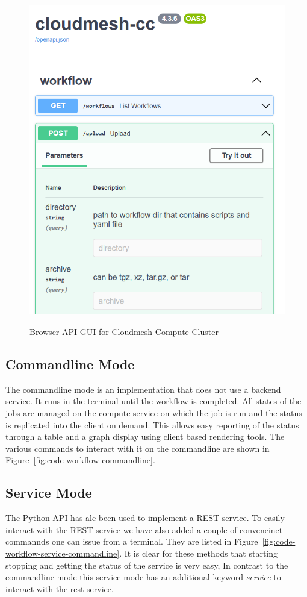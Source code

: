 \begin{figure}[htb]
{\centering
\includegraphics[width=0.52\columnwidth]{images/upload_api.png}
}
\caption{Browser API GUI for Cloudmesh Compute Cluster}

\label{fig:openapi}

\end{figure}


\subsection{Commandline Mode}

The commandline mode is an implementation that does not use a backend
service. It runs in the terminal until the workflow is completed. All
states of the jobs are managed on the compute service on which the job
is run and the status is replicated into the client on demand. This
allows easy reporting of the status through a table and a graph
display using client based rendering tools. The various commands to
interact with it on the commandline are shown in
Figure~\ref{fig:code-workflow-commandline}.


\subsection{Service Mode}

The Python API has ale been used to implement a REST service. To
easily interact with the REST service we have also added a couple of
conveneinet commannds one can issue from a terminal. They are listed
in Figure~\ref{fig:code-workflow-service-commandline}. It is clear for
these methods that starting stopping and getting the status of the
service is very easy, In contrast to the commandline mode this service
mode has an additional keyword {\em service} to interact with the rest service.

